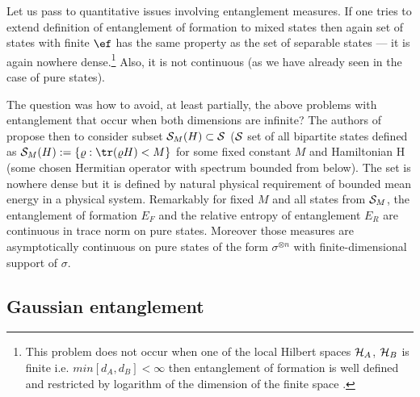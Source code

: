 \documentclass[twocolumn,aps,rmp]{revtex4}
\begin{document}
Let us pass to quantitative issues involving entanglement
measures. If one tries to extend definition of entanglement of
formation to mixed states \cite{InfiniteEntanglementEisert} then again
set of states with finite $\ef$ has the same property as the set of
separable states --- it is again nowhere dense.\footnote{This problem
  does not occur when one of the local Hilbert spaces ${\cal H}_{A}$,
  ${\cal H}_{B}$ is finite i.e. $min[d_{A},d_{B}] <\infty$ then
  entanglement of formation is well defined and restricted by
  logarithm of the dimension of the finite space
  \cite{MajewskiJPA2002}.} Also, it is not continuous (as we have
already seen in the case of pure states).

The question was how to avoid, at least partially, the above problems
with entanglement that occur when both dimensions are infinite? The
authors of \cite{InfiniteEntanglementEisert} propose then to consider
subset ${\cal S}_{M}(H) \subset {\cal S}$ (${\cal S}$ set of all
bipartite states defined as ${\cal S}_{M}(H):= \{ \varrho:
{\tr}(\varrho H)< M \}$ for some fixed constant $M$ and Hamiltonian H
(some chosen Hermitian operator with spectrum bounded from below). The
set is nowhere dense but it is defined by natural physical requirement
of bounded mean energy in a physical system.  Remarkably for fixed $M$
and all states from ${\cal S}_{M}$, the entanglement of formation
$E_{F}$ and the relative entropy of entanglement $E_R$ are continuous
in trace norm on pure states.  Moreover those measures are
asymptotically continuous on pure states of the form $\sigma^{\otimes
  n}$ with finite-dimensional support of $\sigma $.



\subsection{Gaussian entanglement}
\end{document}
